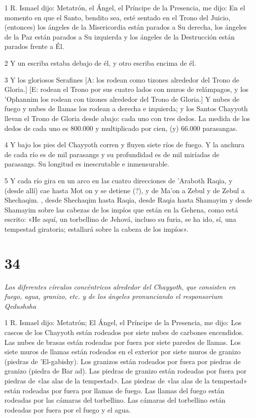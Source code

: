 \par 1 R. Ismael dijo: Metatrón, el Ángel, el Príncipe de la Presencia, me dijo: En el momento en que el Santo, bendito sea, esté sentado en el Trono del Juicio, (entonces) los ángeles de la Misericordia están parados a Su derecha, los ángeles de la Paz están parados a Su izquierda y los ángeles de la Destrucción están parados frente a Él.

\par 2 Y un escriba estaba debajo de él, y otro escriba encima de él.

\par 3 Y los gloriosos Serafines [A: los rodean como tizones alrededor del Trono de Gloria.] [E: rodean el Trono por sus cuatro lados con muros de relámpagos, y los 'Ophannim los rodean con tizones alrededor del Trono de Gloria.] Y nubes de fuego y nubes de llamas los rodean a derecha e izquierda; y los Santos Chayyoth llevan el Trono de Gloria desde abajo: cada uno con tres dedos. La medida de los dedos de cada uno es 800.000 y multiplicado por cien, (y) 66.000 parasangas.

\par 4 Y bajo los pies del Chayyoth corren y fluyen siete ríos de fuego. Y la anchura de cada río es de mil parasangs y su profundidad es de mil miríadas de parasangs. Su longitud es inescrutable e inmensurable.

\par 5 Y cada río gira en un arco en las cuatro direcciones de 'Araboth Raqia, y (desde allí) cae hasta Mot on y se detiene (?), y de Ma'on a Zebul y de Zebul a Shechaqim. , desde Shechaqim hasta Raqia, desde Raqia hasta Shamayim y desde Shamayim sobre las cabezas de los impíos que están en la Gehena, como está escrito: «He aquí, un torbellino de Jehová, incluso su furia, se ha ido, sí, una tempestad giratoria; estallará sobre la cabeza de los impíos».

\chapter{34}

\par \textit{Los diferentes círculos concéntricos alrededor del Chayyoth, que consisten en fuego, agua, granizo, etc. y de los ángeles pronunciando el responsorium Qedushsha}

\par 1 R. Ismael dijo: Metatrón; El Ángel, el Príncipe de la Presencia, me dijo: Los cascos de los Chayyoth están rodeados por siete nubes de carbones encendidos. Las nubes de brasas están rodeadas por fuera por siete paredes de llamas. Los siete muros de llamas están rodeados en el exterior por siete muros de granizo (piedras de 'El-gabishy). Los granizos están rodeados por fuera por piedras de granizo (piedra de Bar ad). Las piedras de granizo están rodeadas por fuera por piedras de «las alas de la tempestad». Las piedras de «las alas de la tempestad» están rodeadas por fuera por llamas de fuego. Las llamas del fuego están rodeadas por las cámaras del torbellino. Las cámaras del torbellino están rodeadas por fuera por el fuego y el agua.

